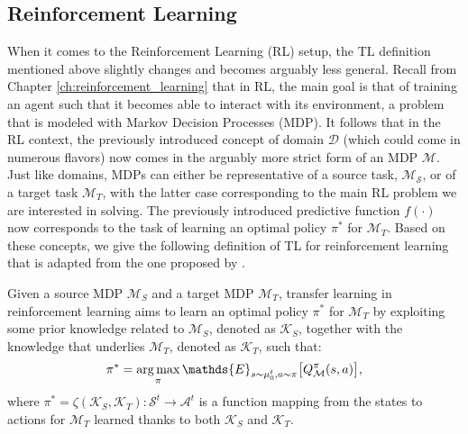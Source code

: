 \subsection{Reinforcement Learning}
\label{sec:reinforcement_learning_tl}
When it comes to the Reinforcement Learning (RL) setup, the TL definition mentioned above slightly changes and becomes arguably less general. Recall from Chapter \ref{ch:reinforcement_learning} that in RL, the main goal is that of training an agent such that it becomes able to interact with its environment, a problem that is modeled with Markov Decision Processes (MDP). It follows that in the RL context, the previously introduced concept of domain $\mathcal{D}$ (which could come in numerous flavors) now comes in the arguably more strict form of an MDP $\mathcal{M}$. Just like domains, MDPs can either be representative of a source task, $\mathcal{M_S}$, or of a target task $\mathcal{M}_T$, with the latter case corresponding to the main RL problem we are interested in solving. The previously introduced predictive function $f(\cdot)$ now corresponds to the task of learning an optimal policy $\pi^*$ for $\mathcal{M}_T$. Based on these concepts, we give the following definition of TL for reinforcement learning that is adapted from the one proposed by \citet{zhu2020transfer}.

\begin{definition}
	Given a source MDP $\mathcal{M}_S$ and a target MDP $\mathcal{M}_T$, transfer learning in reinforcement learning aims to learn an optimal policy $\pi^{*}$ for $\mathcal{M}_T$ by exploiting some prior knowledge related to $\mathcal{M}_S$, denoted as $\mathcal{K}_S$, together with the knowledge that underlies $\mathcal{M}_T$, denoted as $\mathcal{K}_T$, such that:
	\begin{align}
		\pi^{*} = \argmax_{\pi} \mathds{E}_{s \sim\mu_{0}^{t},a\sim\pi}\bigl[Q^{\pi}_\mathcal{M}(s,a)\bigr],
	\end{align}
	where $\pi^* = \zeta(\mathcal{K}_S, \mathcal{K}_T ): \mathcal{S}^t \rightarrow \mathcal{A}^t$ is a function mapping from the states to actions for $\mathcal{M}_T$ learned thanks to both $\mathcal{K}_S$ and $\mathcal{K}_T$.        
\end{definition}

